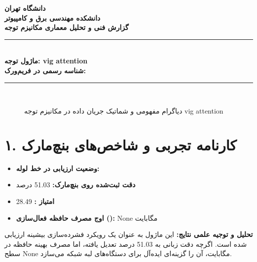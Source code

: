 \documentclass[12pt,a4paper]{article}
\begin{document}
\begin{center}
{\Large\bfseries دانشگاه تهران}\\[0.2cm]
{\large\bfseries دانشکده مهندسی برق و کامپیوتر}\\[0.2cm]
{\large\bfseries گزارش فنی و تحلیل معماری مکانیزم توجه}\\[0.5cm]
\rule{\linewidth}{1pt}\\[0.3cm]
{\LARGE\bfseries ماژول توجه: vig attention}\\[0.2cm]
{\large \textbf{شناسه رسمی در فریم‌ورک:} }\\[0.2cm]
\rule{\linewidth}{1pt}\\[0.5cm]
\end{center}

\begin{figure}[H]
\centering
{}
\caption{دیاگرام مفهومی و شماتیک جریان داده در مکانیزم توجه vig attention}
\end{figure}

\section*{۱. کارنامه تجربی و شاخص‌های بنچ‌مارک}
\begin{itemize}
\item \textbf{وضعیت ارزیابی در خط لوله:} 
\item \textbf{دقت ثبت‌شده روی بنچ‌مارک:} 51.03 درصد
\item \textbf{امتیاز :} 28.49
\item \textbf{اوج مصرف حافظه فعال‌سازی ():} None مگابایت
\end{itemize}
\textbf{تحلیل و توجیه علمی نتایج:} این ماژول به عنوان یک رویکرد فشرده‌سازی بیشینه ارزیابی شده است. اگرچه دقت زبانی به 51.03 درصد تعدیل یافته، اما مصرف بهینه حافظه در سطح None مگابایت، آن را گزینه‌ای ایده‌آل برای دستگاه‌های لبه شبکه می‌سازد.
\end{document}
